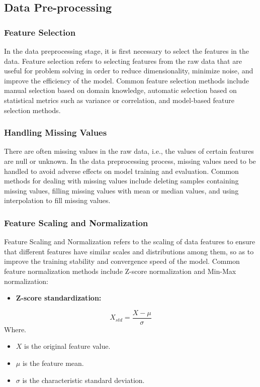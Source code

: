 \documentclass[a4paper,12pt]{article}
\begin{document}
\subsection{Data Pre-processing}
\subsubsection{Feature Selection}
In the data preprocessing stage, it is first necessary to select the features in the data. Feature selection refers to selecting features from the raw data that are useful for problem solving in order to reduce dimensionality, minimize noise, and improve the efficiency of the model. Common feature selection methods include manual selection based on domain knowledge, automatic selection based on statistical metrics such as variance or correlation, and model-based feature selection methods.

\subsubsection{Handling Missing Values}
There are often missing values in the raw data, i.e., the values of certain features are null or unknown. In the data preprocessing process, missing values need to be handled to avoid adverse effects on model training and evaluation. Common methods for dealing with missing values include deleting samples containing missing values, filling missing values with mean or median values, and using interpolation to fill missing values.

\subsubsection{Feature Scaling and Normalization}
Feature Scaling and Normalization refers to the scaling of data features to ensure that different features have similar scales and distributions among them, so as to improve the training stability and convergence speed of the model. Common feature normalization methods include Z-score normalization and Min-Max normalization:
\begin{itemize}
\item \textbf{Z-score standardization:}
\end{itemize}
\[X_{std} = \frac{X-\mu}{\sigma}\]
Where.
\begin{itemize}
\item $X$ is the original feature value.
\item $\mu$ is the feature mean.
\item $\sigma$ is the characteristic standard deviation.
\end{itemize}
\end{document}
